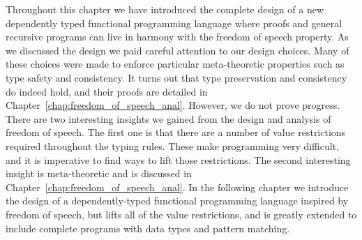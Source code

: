 Throughout this chapter we have introduced the complete design of a
new dependently typed functional programming language where proofs and
general recursive programs can live in harmony with the freedom of
speech property.  As we discussed the design we paid careful attention
to our design choices.  Many of these choices were made to enforce
particular meta-theoretic properties such as type safety and
consistency.  It turns out that type preservation and consistency do
indeed hold, and their proofs are detailed in
Chapter~\ref{chap:freedom_of_speech_anal}.  However, we do not prove
progress.  There are two interesting insights we gained from the
design and analysis of freedom of speech.  The first one is that there
are a number of value restrictions required throughout the typing
rules.  These make programming very difficult, and it is imperative to
find ways to lift those restrictions.  The second interesting insight
is meta-theoretic and is discussed in
Chapter~\ref{chap:freedom_of_speech_anal}.  In the following chapter
we introduce the design of a dependently-typed functional programming
language inspired by freedom of speech, but lifts all of the value
restrictions, and is greatly extended to include complete programs
with data types and pattern matching.

